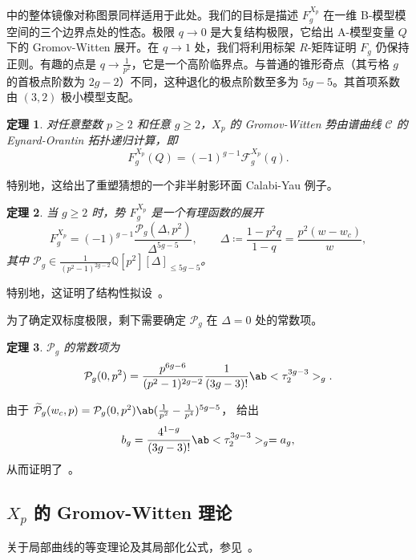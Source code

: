 \documentclass{amsart}
\newtheorem{thm}{定理}[section]
\theoremstyle{definition}
\theoremstyle{remark}
\theoremstyle{plain}
\theoremstyle{definition}
\theoremstyle{remark}
\newcommand{\Q}{\mathbb{Q}}
\newcommand{\mc}[1]{\mathcal{#1}}
\newcommand{\wt}[1]{\widetilde{#1}}
\newcommand{\1}{\mathbf{1}}
\newcommand{\2}{\mathbf{2}}
\newcommand{\3}{\mathbf{3}}
\begin{document}
 中的整体镜像对称图景同样适用于此处。我们的目标是描述 \(F_g^{X_p}\) 在一维 B-模型模空间的三个边界点处的性态。极限 \(q \to 0\) 是大复结构极限，它给出 A-模型变量 \(Q\) 下的 Gromov-Witten 展开。在 \(q \to 1\) 处，我们将利用标架 \(R\)-矩阵证明 \(F_g\) 仍保持正则。有趣的点是 \(q \to \frac{1}{p^2}\)，它是一个高阶临界点。与普通的锥形奇点（其亏格 \(g\) 的首极点阶数为 \(2g-2\)）不同，这种退化的极点阶数至多为 \(5g-5\)。其首项系数由 \((3,2)\) 极小模型支配。

\begin{thm}%
\label{thm:local P1 mirror symmetry}
    对任意整数 \(p \geq 2\) 和任意 \(g \geq 2\)，\(X_p\) 的 Gromov-Witten 势由谱曲线 \(\mc{C}\) 的 Eynard-Orantin 拓扑递归计算，即
    \[ F_g^{X_p}(Q) = (-1)^{g-1}\mc{F}_g^{X_p}(q). \]
\end{thm}

特别地，这给出了重塑猜想的一个非半射影环面 Calabi-Yau 例子。

\begin{thm}%
\label{thm:local P1 rationality}
    当 \(g \geq 2\) 时，势 \(F_g^{X_p}\) 是一个有理函数的展开
    \[ F_g^{X_p} = (-1)^{g-1}\frac{\mc{P}_g(\Delta,p^2)}{\Delta^{5g-5}}, \qquad \Delta \coloneqq \frac{1-p^2q}{1-q} = \frac{p^2(w-w_c)}{w}, \]
    其中 \(\mc{P}_g \in \frac{1}{(p^2-1)^{2g-2}}\Q[p^2][\Delta]_{\leq 5g-5}\)。
\end{thm}

特别地，这证明了结构性拟设~。

为了确定双标度极限，剩下需要确定 \(\mc{P}_g\) 在 \(\Delta = 0\) 处的常数项。

\begin{thm}%
\label{thm:local P1 constant term}
    \(\mc{P}_g\) 的常数项为
    \[ \mc{P}_g(0,p^2) = \frac{p^{6g-6}}{(p^2-1)^{2g-2}}\frac{1}{(3g-3)!}\ab<\tau_2^{3g-3}>_g. \]
\end{thm}

由于 \(\wt{\mc{P}}_g(w_c,p) = \mc{P}_g(0,p^2)\ab(\frac{1}{p^2}-\frac{1}{p^4})^{5g-5}\)， 给出
\[ b_g = \frac{4^{1-g}}{(3g-3)!}\ab<\tau_2^{3g-3}>_g = a_g, \]
从而证明了~。

\subsection{\(X_p\) 的 Gromov-Witten 理论}%
\label{sub:Gromov-Witten theory of Xp}

关于局部曲线的等变理论及其局部化公式，参见~\cite{BryanPandharipande2008}。
\end{document}
